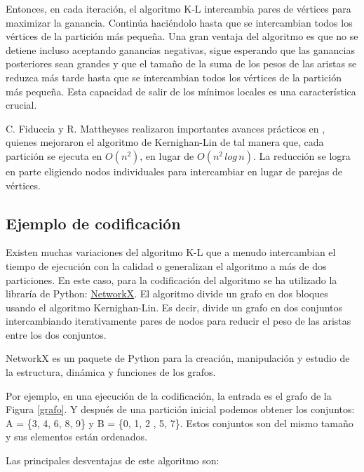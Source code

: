 Entonces, en cada iteración, el algoritmo K-L intercambia pares de vértices para maximizar la ganancia. Continúa haciéndolo hasta que se intercambian todos los vértices de la partición más pequeña. Una gran ventaja del algoritmo es que no se detiene incluso aceptando ganancias negativas, sigue esperando que las ganancias posteriores sean grandes y que el tamaño de la suma de los pesos de las aristas se reduzca más tarde hasta que se intercambian todos los vértices de la partición más pequeña. Esta capacidad de salir de los mínimos locales es una característica crucial.

C. Fiduccia y R. Mattheyses realizaron importantes avances prácticos en \cite{FiducciaMattheyses}, quienes mejoraron el algoritmo de  Kernighan-Lin\cite{KernighanLin} de tal manera que, cada partición se ejecuta en $O({n}^2)$, en lugar de $O({n}^2 \, log \, n)$. La reducción se logra en parte eligiendo nodos individuales para intercambiar en lugar de parejas de vértices.

\subsection{Ejemplo de codificación}

Existen muchas variaciones del algoritmo K-L que a menudo intercambian el tiempo de ejecución con la calidad o generalizan el algoritmo a más de dos particiones. En este caso, para la codificación del algoritmo se ha utilizado la libraría de Python: \href{https://networkx.github.io/documentation/stable/reference/algorithms/generated/networkx.algorithms.community.kernighan_lin.kernighan_lin_bisection.html}{NetworkX}. El algoritmo divide un grafo en dos bloques usando el algoritmo Kernighan-Lin\cite{KernighanLin}. Es decir, divide un grafo en dos conjuntos intercambiando iterativamente pares de nodos para reducir el peso de las aristas entre los dos conjuntos.

\begin{mydef}\label{NetworkX}
	NetworkX es un paquete de Python para la creación, manipulación y estudio de la estructura, dinámica y funciones de los grafos. 
\end{mydef}

Por ejemplo, en una ejecución de la codificación, la entrada es el grafo de la Figura \ref{grafo}. Y después de una partición inicial podemos obtener los conjuntos: A = \{3, 4, 6, 8, 9\} y B = \{0, 1, 2 , 5, 7\}. Estos conjuntos son del mismo tamaño y sus elementos están ordenados.

Las principales desventajas de este algoritmo son:

